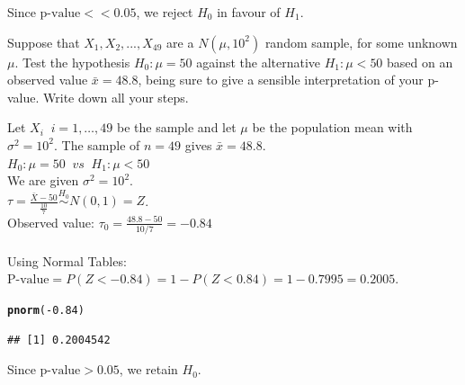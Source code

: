 \documentclass[bigtut]{tutorial}\usepackage[]{graphicx}\usepackage[]{color}
\makeatletter
\newcommand{\hlnum}[1]{\textcolor[rgb]{0.686,0.059,0.569}{#1}}%
\newcommand{\hlopt}[1]{\textcolor[rgb]{0,0,0}{#1}}%
\newcommand{\hlstd}[1]{\textcolor[rgb]{0.345,0.345,0.345}{#1}}%
\newcommand{\hlkwd}[1]{\textcolor[rgb]{0.737,0.353,0.396}{\textbf{#1}}}%
\newenvironment{kframe}{%
 \def\at@end@of@kframe{}%
 \ifinner\ifhmode%
  \def\at@end@of@kframe{\end{minipage}}%
  \begin{minipage}{\columnwidth}%
 \fi\fi%
 \def\FrameCommand##1{\hskip\@totalleftmargin \hskip-\fboxsep
 \colorbox{shadecolor}{##1}\hskip-\fboxsep
     \hskip-\linewidth \hskip-\@totalleftmargin \hskip\columnwidth}%
 \MakeFramed {\advance\hsize-\width
   \@totalleftmargin\z@ \linewidth\hsize
   \@setminipage}}%
 {\par\unskip\endMakeFramed%
 \at@end@of@kframe}
\newenvironment{knitrout}{}{} %
\makeatother
\begin{document}
\begin{tutorial}
\begin{questions}
\begin{solution}
\vspace{.5cm}
Since $\text{p-value} << 0.05$, we reject $H_{0}$ in favour of $H_{1}$. \\
\end{solution}





\question 

Suppose that $X_1,X_2,...,X_{49}$ are a $N(\mu,10^2)$ random sample, for some unknown $\mu$. Test the hypothesis $H_0 : \mu = 50$ against the alternative $H_1 : \mu < 50$ based on an observed value  $ \bar{x} = 48.8$, being sure to give a sensible interpretation of your p-value. Write down all your steps.


\begin{solution}
Let $X_{i} \;\; i=1,\ldots,49$ be the sample and let $\mu$ be the population mean with $\sigma^2=10^2$. The sample of $n=49$ gives $\bar{x} = 48.8$.\\

$H_0: \mu=50  \;\; vs \;\; H_1: \mu < 50$ \\

We are given $\sigma^2 = 10^2$. \\

$\tau = \frac{ \bar{X} - 50}{\frac{10}{7}} \overset{H_0}{\sim} N(0,1) = Z$. \\
Observed value: $\tau_{0} = \frac{48.8-50}{10/7} = -0.84$ \\

 \\

Using Normal Tables: \\
$\text{P-value} = P( Z < -0.84) = 1-P(Z < 0.84) = 1-0.7995  = 0.2005$. \\

\begin{knitrout}
\color{fgcolor}\begin{kframe}
\begin{alltt}
\hlkwd{pnorm}\hlstd{(}\hlopt{-}\hlnum{0.84}\hlstd{)}
\end{alltt}
\begin{verbatim}
## [1] 0.2004542
\end{verbatim}
\end{kframe}
\end{knitrout}

\vspace{.5cm}
Since $\text{p-value} > 0.05$, we retain $H_{0}$. \\


\end{solution}
\end{questions}
\end{tutorial}
\end{document}

